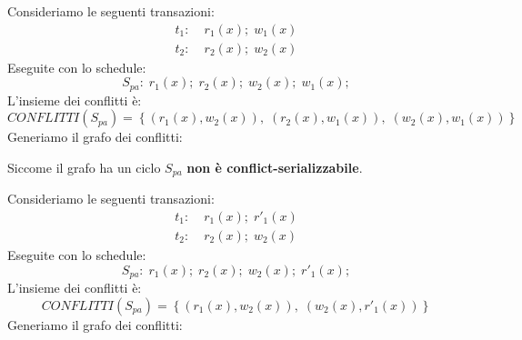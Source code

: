 \documentclass[a4paper,twoside]{article}
\begin{document}
\vspace{1em}
\noindent
\begin{example}
  Consideriamo le seguenti transazioni:
  \[
    \begin{aligned}
      t_1:\; & r_1(x); \; w_1(x) \\
      t_2:\; & r_2(x); \; w_2(x)
    \end{aligned}
  \] 
  Eseguite con lo schedule:
  \[
    S_{pa}:\; r_1(x); \; r_2(x); \; w_2(x); \; w_1(x);
  \] 
  L'insieme dei conflitti è:
  \[
    CONFLITTI(S_{pa}) = \left\{ (r_1(x), w_2(x)),\; (r_2(x), w_1(x)),\; (w_2(x), w_1(x)) \right\}
  \] 
  Generiamo il grafo dei conflitti:
  \begin{figure}[H]
    \centering
  \end{figure}
  \noindent
  Siccome il grafo ha un ciclo \( S_{pa} \) \textbf{non è conflict-serializzabile}.
\end{example}

\begin{example}
  Consideriamo le seguenti transazioni:
  \[
    \begin{aligned}
      t_1:\; & r_1(x); \; r'_1(x) \\
      t_2:\; & r_2(x); \; w_2(x)
    \end{aligned}
  \] 
  Eseguite con lo schedule:
  \[
    S_{pa}:\; r_1(x); \; r_2(x); \; w_2(x); \; r'_1(x);
  \] 
  L'insieme dei conflitti è:
  \[
    CONFLITTI(S_{pa}) = \left\{ (r_1(x), w_2(x)),\; (w_2(x), r'_1(x)) \right\}
  \] 
  Generiamo il grafo dei conflitti:
  \begin{figure}[H]
    \centering
  \end{figure}
\end{example}
\end{document}
